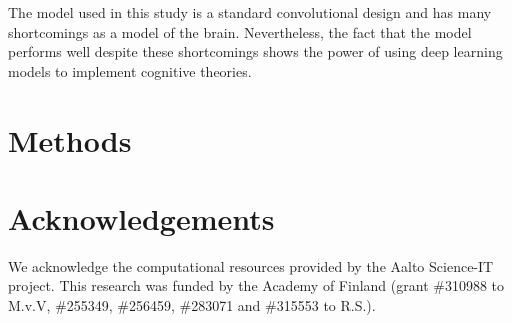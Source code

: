 \documentclass[a4paper, 10pt]{vanvliet_paper}
\begin{document}
The model used in this study is a standard convolutional design and has many shortcomings as a model of the brain.
Nevertheless, the fact that the model performs well despite these shortcomings shows the power of using deep learning models to implement cognitive theories.

\section{Methods}
\section{Acknowledgements}
We acknowledge the computational resources provided by the Aalto Science-IT project.
This research was funded by the Academy of Finland (grant \#310988 to M.v.V, \#255349, \#256459, \#283071 and \#315553 to R.S.).

\newpage
\printbibliography{}
\end{document}
